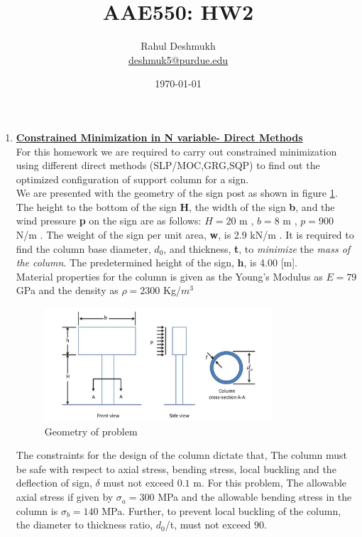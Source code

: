 \documentclass[12pt]{article}
\title{AAE550: HW2}
\author{Rahul Deshmukh \\\href{mailto:deshmuk5@purdue.edu}{{\color{blue}deshmuk5@purdue.edu}} }
\date{\today}
\begin{document}
\maketitle
\begin{enumerate}[I]
\item \underline{\textbf{Constrained Minimization in N variable- Direct Methods}}\\
For this homework we are required to carry out constrained minimization using different direct methods (SLP/MOC,GRG,SQP) to find out the optimized configuration of support column for a sign.\\

We are presented with the geometry of the sign post as shown in figure \ref{fig:main_fig}. The height to the bottom of the sign \textbf{H}, the width of the sign \textbf{b}, and the wind pressure \textbf{p} on the sign are as follows: $H= 20$ m , $b=8$ m , $p=900$ N/m . The weight of the sign per unit area, \textbf{w}, is 2.9 kN/m . It is required to find the column base diameter, \textbf{$d_0$}, and thickness, \textbf{t}, to \textit{minimize} the \textit{mass of the column}. The predetermined height of the sign, \textbf{h}, is 4.00 [m].\\

Material properties for the column is given as the Young's Modulus as $E=79$ GPa and the density as $\rho=2300$ Kg/$m^3$
\begin{figure}[!h]
  \centering
    \includegraphics[width=0.8\textwidth]{problem_fig.JPG}
    \caption{Geometry of problem}
  \label{fig:main_fig}
\end{figure}

The constraints for the design of the column dictate that, The column must be safe with respect to axial stress, bending stress, local buckling and the deflection of sign, $\delta$ must not exceed $0.1$ m. For this problem, The allowable axial stress if given by $\sigma_a=300$ MPa and the allowable bending stress in the column is $\sigma_{b}=140 $ MPa. Further, to prevent local buckling of the column, the diameter to thickness ratio, $d_0$/t, must not exceed $90$.\\


\end{enumerate}
\end{document}
